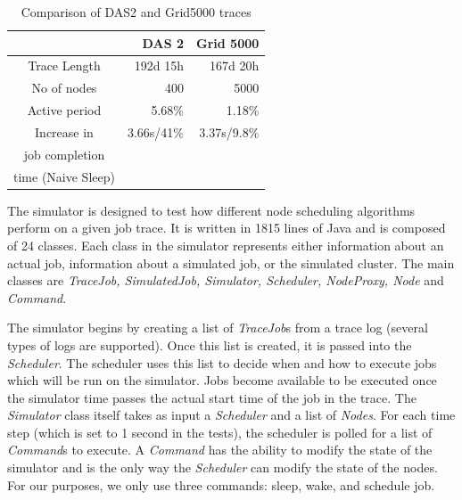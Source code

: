 \begin{table}
    \centering
    \label{tab:trace-comp}
    \begin{tabular}{|c|r|r|}
        \hline
        & {\bf DAS 2} & {\bf Grid 5000} \\
        \hline
        Trace Length & 192d 15h & 167d 20h\\
        \hline
        No of nodes & 400 & 5000 \\
        \hline
        Active period & 5.68\% & 1.18\% \\
        \hline
        Increase in & 3.66s/41\% & 3.37s/9.8\%\\
        job completion & & \\
        time (Naive Sleep) & &\\
        \hline
    \end{tabular}
    \caption{Comparison of DAS2 and Grid5000 traces}
\end{table}

The simulator is designed to test how different node scheduling algorithms perform on a given job trace. It is written in 1815 lines of Java and is composed of 24 classes. Each class in the simulator represents either information about an actual job, information about a simulated job, or the simulated cluster. The main classes are {\em TraceJob, SimulatedJob, Simulator, Scheduler, NodeProxy, Node} and {\em Command}. 

The simulator begins by creating a list of \emph{TraceJob}s from a trace log (several types of logs are supported). Once this list is created, it is passed into the \emph{Scheduler}. The scheduler uses this list to decide when and how to execute jobs which will be run on the simulator. Jobs become available to be executed once the simulator time passes the actual start time of the job in the trace. The \emph{Simulator} class itself takes as input a \emph{Scheduler} and a list of \emph{Nodes}. For each time step (which is set to 1 second in the tests), the scheduler is polled for a list of \emph{Command}s to execute. A \emph{Command} has the ability to modify the state of the simulator and is the only way the \emph{Scheduler} can modify the state of the nodes. For our purposes, we only use three commands: sleep, wake, and schedule job. %

